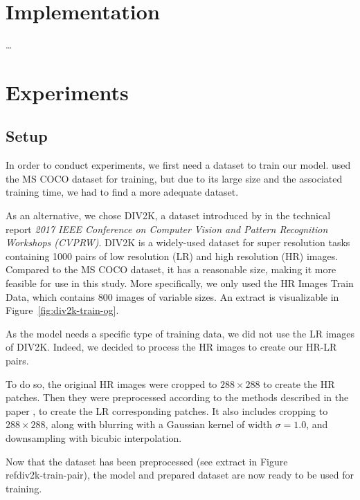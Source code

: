 \documentclass{article}
\begin{document}
{
    \section{Implementation}
    \label{sec:implementation}

    …
}

{
    \section{Experiments}
    \label{sec:experiments}

    \subsection{Setup}
    \label{subsec:setup}

    In order to conduct experiments, we first need a dataset to train our model. \cite{sr} used the MS COCO dataset \citep{mscoco} for training, but due to its large size and the associated training time, we had to find a more adequate dataset.

    As an alternative, we chose DIV2K, a dataset introduced by \cite{div2k_ds} in the technical report \textit{2017 IEEE Conference on Computer Vision and Pattern Recognition Workshops (CVPRW)}. DIV2K is a widely-used dataset for super resolution tasks containing 1000 pairs of low resolution (LR) and high resolution (HR) images. Compared to the MS COCO dataset, it has a reasonable size, making it more feasible for use in this study. More specifically, we only used the HR Images Train Data, which contains 800 images of variable sizes. An extract is visualizable in Figure~\ref{fig:div2k-train-og}.

    \bigskip

    As the model needs a specific type of training data, we did not use the LR images of DIV2K. Indeed, we decided to process the HR images to create our HR-LR pairs. %

    To do so, the original HR images were cropped to $288 \times 288$ to create the HR patches. Then they were preprocessed according to the methods described in the paper \citep{sr}, to create the LR corresponding patches. It also includes cropping to $288 \times 288$, along with blurring with a Gaussian kernel of width $\sigma = 1.0$, and downsampling with bicubic interpolation.

    Now that the dataset has been preprocessed (see extract in Figure~\\ref{div2k-train-pair}), the model and prepared dataset are now ready to be used for training.

}
\end{document}
